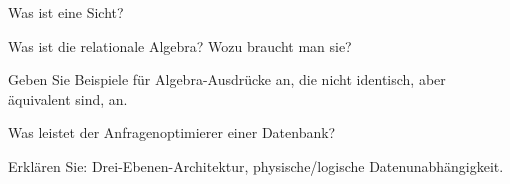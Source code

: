 \begin{fragen}
  \begin{enumeration}
    \item Was ist eine Sicht?
    \item Was ist die relationale Algebra? Wozu braucht man sie?
    \item Geben Sie Beispiele für Algebra-Ausdrücke an, die nicht identisch, aber äquivalent sind, an.
    \item Was leistet der Anfragenoptimierer einer Datenbank?
    \item Erklären Sie: Drei-Ebenen-Architektur, physische/logische Datenunabhängigkeit.
  \end{enumeration}
\end{fragen}